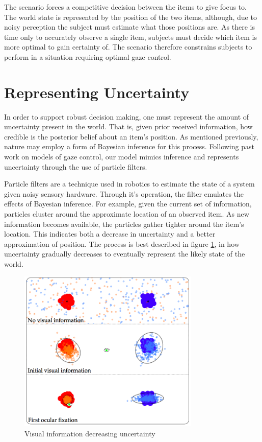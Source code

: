 \documentclass[11]{article}
\begin{document}
The scenario forces a competitive decision between the items to give focus to. 
The world state is represented by the position of the two items, although, due to noisy perception the subject must estimate what those positions are.
As there is time only to accurately observe a single item, subjects must decide which item is more optimal to gain certainty of. 
The scenario therefore constrains subjects to perform in a situation requiring optimal gaze control. 

\section{Representing Uncertainty}
In order to support robust decision making, one must represent the amount of uncertainty present in the world. 
That is, given prior received information, how credible is the posterior belief about an item's position. 
As mentioned previously, nature may employ a form of Bayesian inference for this process.
Following past work on models of gaze control\cite{nunezvarela2013}, our model mimics inference and represents uncertainty through the use of particle filters.

Particle filters are a technique used in robotics to estimate the state of a system given noisy sensory hardware\cite{thrun2005}.
Through it's operation, the filter emulates the effects of Bayesian inference.   
For example, given the current set of information, particles cluster around the approximate location of an observed item.
As new information becomes available, the particles gather tighter around the item's location.
This indicates both a decrease in uncertainty and a better approximation of position. 
The process is best described in figure \ref{fig:uncertainty}, in how uncertainty gradually decreases to eventually represent the likely state of the world. 

\begin{figure}[!h]
	\centering
	\includegraphics[width=0.77\textwidth]{figures/uncertainty.png}
	\caption{Visual information decreasing uncertainty}
	\label{fig:uncertainty}
\end{figure}
\end{document}
